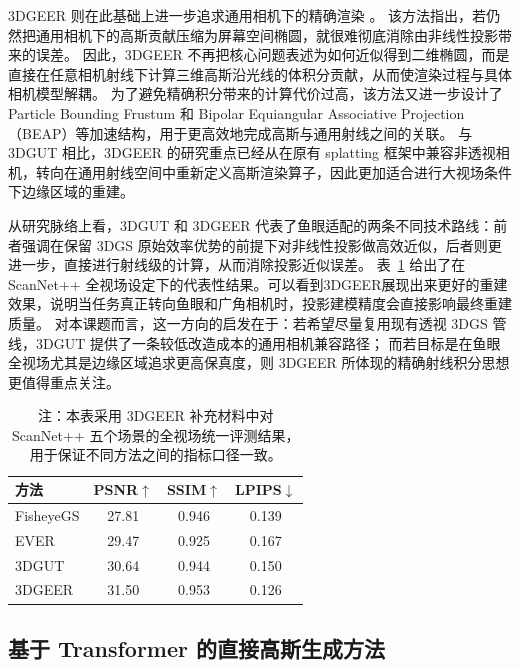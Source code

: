 3DGEER 则在此基础上进一步追求通用相机下的精确渲染 \cite{huang20253dgeer}。
该方法指出，若仍然把通用相机下的高斯贡献压缩为屏幕空间椭圆，就很难彻底消除由非线性投影带来的误差。
因此，3DGEER 不再把核心问题表述为如何近似得到二维椭圆，而是直接在任意相机射线下计算三维高斯沿光线的体积分贡献，从而使渲染过程与具体相机模型解耦。
为了避免精确积分带来的计算代价过高，该方法又进一步设计了 Particle Bounding Frustum 和 Bipolar Equiangular Associative Projection（BEAP）等加速结构，用于更高效地完成高斯与通用射线之间的关联。
与 3DGUT 相比，3DGEER 的研究重点已经从在原有 splatting 框架中兼容非透视相机，转向在通用射线空间中重新定义高斯渲染算子，因此更加适合进行大视场条件下边缘区域的重建。

从研究脉络上看，3DGUT 和 3DGEER 代表了鱼眼适配的两条不同技术路线：前者强调在保留 3DGS 原始效率优势的前提下对非线性投影做高效近似，后者则更进一步，直接进行射线级的计算，从而消除投影近似误差。
表~\ref{tab:gs-fisheye} 给出了在 ScanNet++ 全视场设定下的代表性结果。可以看到3DGEER展现出来更好的重建效果，说明当任务真正转向鱼眼和广角相机时，投影建模精度会直接影响最终重建质量。
对本课题而言，这一方向的启发在于：若希望尽量复用现有透视 3DGS 管线，3DGUT 提供了一条较低改造成本的通用相机兼容路径；
而若目标是在鱼眼全视场尤其是边缘区域追求更高保真度，则 3DGEER 所体现的精确射线积分思想更值得重点关注。

\begin{table}[htbp]
    \centering
    \caption{通用相机适配方法在 ScanNet++ 全视场上的代表性结果}
    \label{tab:gs-fisheye}
    \small
    \begin{tabular}{lccc}
        \toprule
        方法 & PSNR$\uparrow$ & SSIM$\uparrow$ & LPIPS$\downarrow$ \\
        \midrule
        FisheyeGS & 27.81 & 0.946 & 0.139 \\
        EVER & 29.47 & 0.925 & 0.167 \\
        3DGUT & 30.64 & 0.944 & 0.150 \\
        3DGEER & 31.50 & 0.953 & 0.126 \\
        \bottomrule
    \end{tabular}
    \caption*{\footnotesize 注：本表采用 3DGEER 补充材料中对 ScanNet++ 五个场景的全视场统一评测结果，用于保证不同方法之间的指标口径一致。}
\end{table}

\subsection{基于 Transformer 的直接高斯生成方法}

